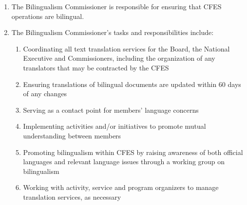 \begin{enumerate}
 \item
  The Bilingualism Commissioner is responsible for ensuring that CFES operations are bilingual.
 \item
  The Bilingualism Commissioner’s tasks and responsibilities include:

  \begin{enumerate}
   \item
    Coordinating all text translation services for the Board, the National Executive and Commissioners, including the organization of any translators that may be contracted by the CFES
   \item
    Ensuring translations of bilingual documents are updated within 60 days of any changes
   \item
    Serving as a contact point for members’ language concerns
   \item
    Implementing activities and/or initiatives to promote mutual understanding between members
   \item
    Promoting bilingualism within CFES by raising awareness of both official languages and relevant language issues through a working group on bilingualism
   \item
    Working with activity, service and program organizers to manage translation services, as necessary
  \end{enumerate}
\end{enumerate}
